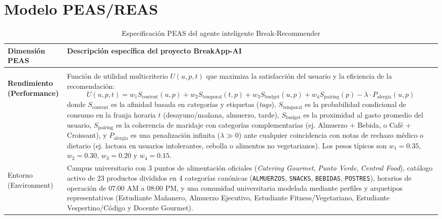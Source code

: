 \documentclass{article}
\begin{document}
\section{Modelo PEAS/REAS}

\begin{longtable}{|>{\bfseries}p{} |p{}|}
    \caption{Especificación PEAS del agente inteligente Break-Recommender}
    \label{tab:peas-breakapp} \\

    \toprule
    \textbf{Dimensión PEAS} & \textbf{Descripción específica del proyecto BreakApp-AI} \\
    \midrule
    \endfirsthead

    \endhead

    \midrule
    \multicolumn{2}{r}{{Continúa en la siguiente página}} \\
    \endfoot

    \bottomrule
    \endlastfoot

    \textbf{Rendimiento (Performance)}
    &
    Función de utilidad multicriterio $U(u, p, t)$ que maximiza la satisfacción del usuario y la eficiencia de la recomendación:
    \[
        U(u, p, t) = w_1 S_{\mathrm{content}}(u, p) + w_2 S_{\mathrm{temporal}}(t, p) + w_3 S_{\mathrm{budget}}(u, p) + w_4 S_{\mathrm{pairing}}(p) - \lambda \cdot P_{\mathrm{alergia}}(u, p)
    \]
    donde $S_{\mathrm{content}}$ es la afinidad basada en categorías y etiquetas (\textit{tags}), $S_{\mathrm{temporal}}$ es la probabilidad condicional de consumo en la franja horaria $t$ (desayuno/mañana, almuerzo, tarde), $S_{\mathrm{budget}}$ es la proximidad al gasto promedio del usuario, $S_{\mathrm{pairing}}$ es la coherencia de maridaje con categorías complementarias (ej. Almuerzo + Bebida, o Café + Croissant), y $P_{\mathrm{alergia}}$ es una penalización infinita ($\lambda \gg 0$) ante cualquier coincidencia con notas de rechazo médico o dietario (ej. lactosa en usuarios intolerantes, cebolla o alimentos no vegetarianos). Los pesos típicos son $w_1 = 0.35$, $w_2 = 0.30$, $w_3 = 0.20$ y $w_4 = 0.15$.
    \\ \hline

    Entorno (Environment)
    &
    Campus universitario con 3 puntos de alimentación oficiales (\textit{Catering Gourmet}, \textit{Punto Verde}, \textit{Central Food}), catálogo activo de 23 productos divididos en 4 categorías canónicas (\texttt{ALMUERZOS}, \texttt{SNACKS}, \texttt{BEBIDAS}, \texttt{POSTRES}), horarios de operación de 07:00 AM a 08:00 PM, y una comunidad universitaria modelada mediante perfiles y arquetipos representativos (Estudiante Mañanero, Almuerzo Ejecutivo, Estudiante Fitness/Vegetariano, Estudiante Vespertino/Código y Docente Gourmet).
    \\ \hline


\end{longtable}
\end{document}

